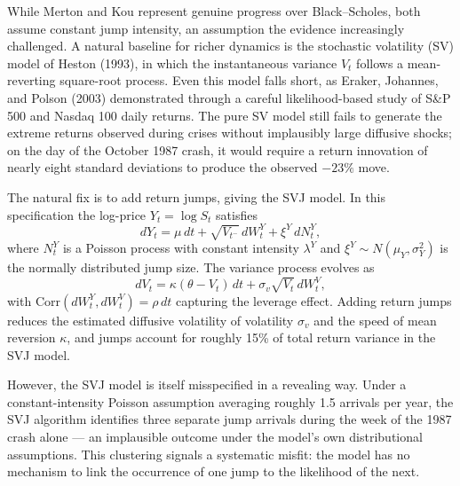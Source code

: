 \documentclass[12pt]{article}
\begin{document}
While Merton and Kou represent genuine progress over Black--Scholes, both assume constant jump intensity, an assumption the evidence increasingly challenged. A natural baseline for richer dynamics is the stochastic volatility (SV) model of Heston (1993), in which the instantaneous variance $V_t$ follows a mean-reverting square-root process. Even this model falls short, as Eraker, Johannes, and Polson (2003) demonstrated through a careful likelihood-based study of S\&P 500 and Nasdaq 100 daily returns. The pure SV model still fails to generate the extreme returns observed during crises without implausibly large diffusive shocks; on the day of the October 1987 crash, it would require a return innovation of nearly eight standard deviations to produce the observed $-23\%$ move.

The natural fix is to add return jumps, giving the SVJ model. In this specification the log-price $Y_t = \log S_t$ satisfies
\begin{equation}
dY_t = \mu\,dt + \sqrt{V_{t^-}}\,dW^Y_t + \xi^Y\,dN^Y_t,
\end{equation}
where $N^Y_t$ is a Poisson process with constant intensity $\lambda^Y$ and $\xi^Y \sim N(\mu_Y, \sigma_Y^2)$ is the normally distributed jump size. The variance process evolves as
\begin{equation}
dV_t = \kappa(\theta - V_t)\,dt + \sigma_v\sqrt{V_t}\,dW^V_t,
\end{equation}
with $\mathrm{Corr}(dW^Y_t, dW^V_t) = \rho\,dt$ capturing the leverage effect. Adding return jumps reduces the estimated diffusive volatility of volatility $\sigma_v$ and the speed of mean reversion $\kappa$, and jumps account for roughly 15\% of total return variance in the SVJ model.

However, the SVJ model is itself misspecified in a revealing way. Under a constant-intensity Poisson assumption averaging roughly 1.5 arrivals per year, the SVJ algorithm identifies three separate jump arrivals during the week of the 1987 crash alone --- an implausible outcome under the model's own distributional assumptions. This clustering signals a systematic misfit: the model has no mechanism to link the occurrence of one jump to the likelihood of the next.
\end{document}
